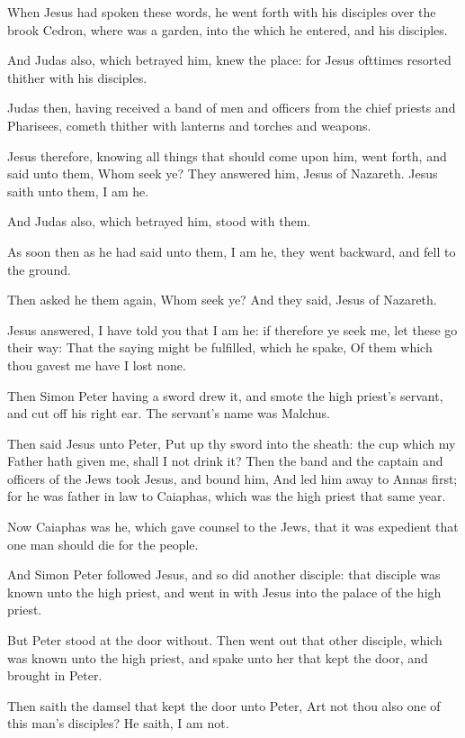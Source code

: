 \Chapter
\Verse When Jesus had spoken these words, he went forth with his disciples over the brook Cedron, where was a garden, into the which he entered, and his disciples.

\Verse And Judas also, which betrayed him, knew the place: for Jesus ofttimes resorted thither with his disciples.

\Verse Judas then, having received a band of men and officers from the chief priests and Pharisees, cometh thither with lanterns and torches and weapons.

\Verse Jesus therefore, knowing all things that should come upon him, went forth, and said unto them, Whom seek ye?  \Verse They answered him, Jesus of Nazareth. Jesus saith unto them, I am he.

And Judas also, which betrayed him, stood with them.

\Verse As soon then as he had said unto them, I am he, they went backward, and fell to the ground.

\Verse Then asked he them again, Whom seek ye? And they said, Jesus of Nazareth.

\Verse Jesus answered, I have told you that I am he: if therefore ye seek me, let these go their way: \Verse That the saying might be fulfilled, which he spake, Of them which thou gavest me have I lost none.

\Verse Then Simon Peter having a sword drew it, and smote the high priest's servant, and cut off his right ear. The servant's name was Malchus.

\Verse Then said Jesus unto Peter, Put up thy sword into the sheath: the cup which my Father hath given me, shall I not drink it?  \Verse Then the band and the captain and officers of the Jews took Jesus, and bound him, \Verse And led him away to Annas first; for he was father in law to Caiaphas, which was the high priest that same year.

\Verse Now Caiaphas was he, which gave counsel to the Jews, that it was expedient that one man should die for the people.

\Verse And Simon Peter followed Jesus, and so did another disciple: that disciple was known unto the high priest, and went in with Jesus into the palace of the high priest.

\Verse But Peter stood at the door without. Then went out that other disciple, which was known unto the high priest, and spake unto her that kept the door, and brought in Peter.

\Verse Then saith the damsel that kept the door unto Peter, Art not thou also one of this man's disciples? He saith, I am not.

